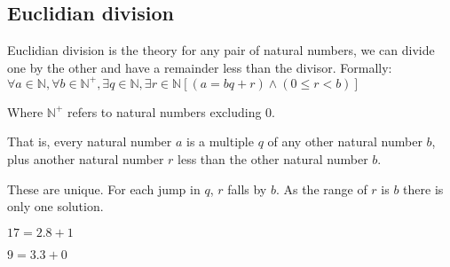 
\subsection{Euclidian division}

Euclidian division is the theory for any pair of natural numbers, we can divide one by the other and have a remainder less than the divisor. Formally:
$\forall a \in \mathbb{N} ,\forall b \in \mathbb{N}^+ ,\exists q \in \mathbb{N},\exists r\in \mathbb{N} [(a=bq+r)\land (0\le r < b)]$

Where \(\mathbb{N}^+\) refers to natural numbers excluding \(0\).

That is, every natural number \(a\) is a multiple \(q\) of any other natural number \(b\), plus another natural number \(r\) less than the other natural number \(b\).

These are unique. For each jump in \(q\), \(r\) falls by \(b\). As the range of \(r\) is \(b\) there is only one solution.

$17=2.8+1$

$9=3.3+0$

